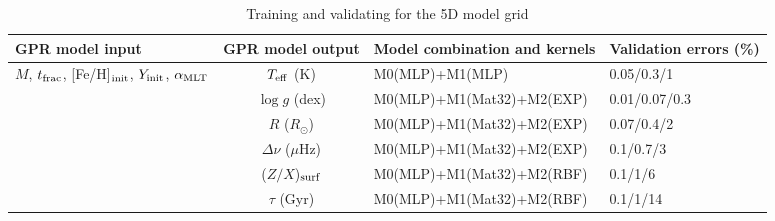 \begin{table*}
	\centering
	\caption{Training and validating for the 5D model grid}
	\label{tab:gpdetails}
	\begin{tabular}{lcll} %
		\hline
		 GPR model input &\multicolumn{1}{l}{GPR model output} & \multicolumn{1}{c}{Model combination and kernels}& 
		  \multicolumn{1}{c}{Validation errors (\%)}\\ 
		 \hline
		 $M$, $t_{\rm frac}$, [Fe/H]$_{\rm init}$, $Y_{\rm init}$, $\alpha_{\rm MLT}$ & $T_{\rm eff}$ (K) &M0(MLP)+M1(MLP)& 0.05/0.3/1\\
		 &$\log g$ (dex)  & M0(MLP)+M1(Mat32)+M2(EXP) &0.01/0.07/0.3\\
		 &$R$ ($R_{\odot}$) & M0(MLP)+M1(Mat32)+M2(EXP) &0.07/0.4/2\\
		  &$\Delta\nu$ ($\mu$Hz) & M0(MLP)+M1(Mat32)+M2(EXP) &0.1/0.7/3\\
		  &($Z/X$)$_{\rm surf}$ & M0(MLP)+M1(Mat32)+M2(RBF) & 0.1/1/6\\
		  &$\tau$ (Gyr) & M0(MLP)+M1(Mat32)+M2(RBF) & 0.1/1/14\\
       \hline
	\end{tabular}
\end{table*}








